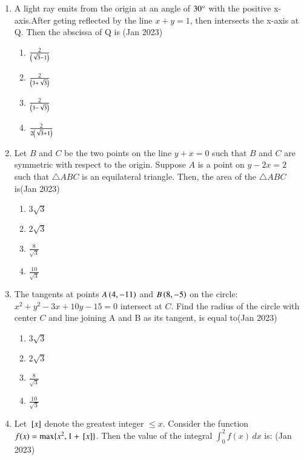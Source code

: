 \documentclass[journal,12pt,onecolumn]{IEEEtran}
\theoremstyle{remark}
\begin{document}
\begin{enumerate}
\item A light ray emits from the origin at an angle of $30\degree$ with the positive x-axis.After geting reflected by the line $x + y = 1$, then intersects the x-axis at Q. Then the abscissa of Q is \hfill(Jan 2023)
\begin{multicols}{2}
\begin{enumerate}
    \item $\frac{2}{\left(\sqrt{3} - 1\right)}$\\
     \item $\frac{2}{\left(3 + \sqrt{3}\right)}$
     \item $\frac{2}{\left(3 - \sqrt{3}\right)}$\\
     \item $\frac{2}{2\left(\sqrt{3} + 1\right)}$
\end{enumerate}
\end{multicols}
\item Let $B$ and $C$ be the two points on the line $y + x = 0$
such that $B$ and $C$ are symmetric with respect to the origin. Suppose $A$ is a point on $y - 2x = 2$ such that $\triangle ABC$ is an equilateral triangle. Then, the area of the $\triangle ABC$ is\hfill(Jan 2023)
\begin{multicols}{4}
\begin{enumerate}
    \item $3\sqrt{3}$
   \item $2\sqrt{3}$
   \item $\frac{8}{\sqrt{3}}$
   \item $\frac{10}{\sqrt{3}}$
\end{enumerate}
\end{multicols}
\item The tangents at points  $A\left(4, -11\right)$ and $B\left(8, -5\right)$ on the circle: $x^2 + y^2 - 3x + 10y - 15 = 0$ intersect at $C$. Find the radius of the circle with center $C$ and line joining A and B as its
tangent, is equal to\hfill(Jan 2023)
\begin{multicols}{4}
\begin{enumerate}
    \item $3\sqrt{3}$
   \item $2\sqrt{3}$
   \item $\frac{8}{\sqrt{3}}$
   \item $\frac{10}{\sqrt{3}}$
\end{enumerate}
\end{multicols}
\item Let ${}\left[x\right]$ denote the greatest integer $\leq x$. Consider the function $f(x) = \max \{x^2, 1 + {}\left[x\right]\}$. Then the value of the integral $\int_0^2 f(x)\,dx$ is: \hfill (Jan 2023)

\end{enumerate}
\end{document}
